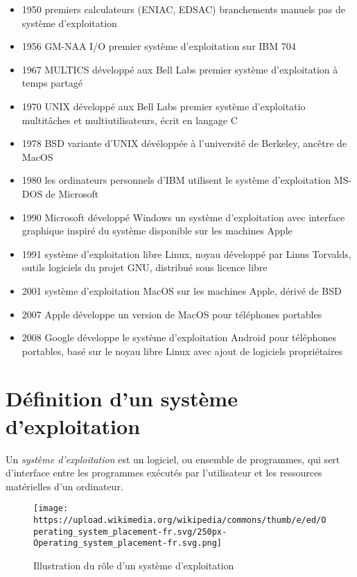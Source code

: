 \documentclass[
  11pt,
]{article}
\newcounter{prop}
\newcounter{prog}
\newcounter{logi}
\begin{document}
\begin{itemize}
\item
  1950 premiers calculateurs (ENIAC, EDSAC) branchements manuels pas de
  système d'exploitation
\item
  1956 GM-NAA I/O premier système d'exploitation sur IBM 704
\item
  1967 MULTICS développé aux Bell Labs premier système d'exploitation à
  temps partagé
\item
  1970 UNIX développé aux Bell Labs premier système d'exploitatio
  multitâches et multiutilisateurs, écrit en langage C
\item
  1978 BSD variante d'UNIX dévéloppée à l'université de Berkeley,
  ancêtre de MacOS
\item
  1980 les ordinateurs personnels d'IBM utilisent le système
  d'exploitation MS-DOS de Microsoft
\item
  1990 Microsoft développé Windows un système d'exploitation avec
  interface graphique inspiré du système disponible sur les machines
  Apple
\item
  1991 système d'exploitation libre Linux, noyau développé par Linus
  Torvalds, outils logiciels du projet GNU, distribué sous licence libre
\item
  2001 système d'exploitation MacOS sur les machines Apple, dérivé de
  BSD
\item
  2007 Apple développe un version de MacOS pour téléphones portables
\item
  2008 Google développe le système d'exploitation Android pour
  téléphones portables, basé sur le noyau libre Linux avec ajout de
  logiciels propriétaires
\end{itemize}

\hypertarget{duxe9finition-dun-systuxe8me-dexploitation}{%
\section{Définition d'un système
d'exploitation}\label{duxe9finition-dun-systuxe8me-dexploitation}}

Un \emph{système d'exploitation} est un logiciel, ou ensemble de
programmes, qui sert d'interface entre les programmes exécutés par
l'utilisateur et les ressources matérielles d'un ordinateur.

\begin{figure}
\centering
\texttt{[image: https://upload.wikimedia.org/wikipedia/commons/thumb/e/ed/Operating\_system\_placement-fr.svg/250px-Operating\_system\_placement-fr.svg.png]}
\caption{Illustration du rôle d'un système d'exploitation}
\end{figure}
\end{document}
